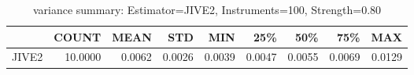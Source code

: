 \begin{table}[ht]
\centering
\caption{variance summary: Estimator=JIVE2, Instruments=100, Strength=0.80}
\begin{tabular}{lrrrrrrrr}
\toprule
 & COUNT & MEAN & STD & MIN & 25\% & 50\% & 75\% & MAX \\
\midrule
JIVE2 & 10.0000 & 0.0062 & 0.0026 & 0.0039 & 0.0047 & 0.0055 & 0.0069 & 0.0129 \\
\bottomrule
\end{tabular}
\end{table}
